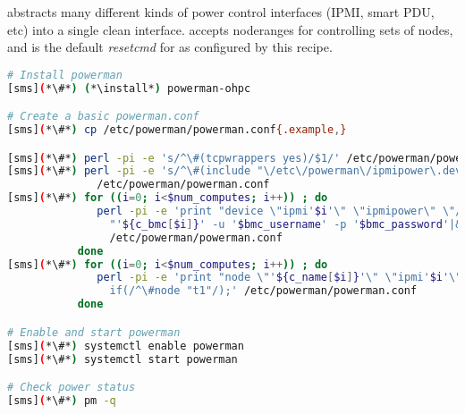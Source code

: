 \powerman{} abstracts many different kinds of power control interfaces (IPMI, 
smart PDU, etc) into a single clean interface. \powerman{} accepts noderanges
for controlling sets of nodes, and is the default {\em resetcmd} for \conman{}
as configured by this recipe.

\begin{lstlisting}[language=bash,keywords={},upquote=true]
# Install powerman
[sms](*\#*) (*\install*) powerman-ohpc

# Create a basic powerman.conf
[sms](*\#*) cp /etc/powerman/powerman.conf{.example,}

[sms](*\#*) perl -pi -e 's/^\#(tcpwrappers yes)/$1/' /etc/powerman/powerman.conf
[sms](*\#*) perl -pi -e 's/^\#(include "\/etc\/powerman\/ipmipower\.dev")/$1/' \
              /etc/powerman/powerman.conf
[sms](*\#*) for ((i=0; i<$num_computes; i++)) ; do
              perl -pi -e 'print "device \"ipmi'$i'\" \"ipmipower\" \"/usr/sbin/ipmipower -h ".
                "'${c_bmc[$i]}' -u '$bmc_username' -p '$bmc_password'|&\"\n" if(/^\#device "ipmi1"/);' \
                /etc/powerman/powerman.conf
           done
[sms](*\#*) for ((i=0; i<$num_computes; i++)) ; do
              perl -pi -e 'print "node \"'${c_name[$i]}'\" \"ipmi'$i'\" \"'${c_bmc[$i]}'\"\n"
                if(/^\#node "t1"/);' /etc/powerman/powerman.conf
           done

# Enable and start powerman
[sms](*\#*) systemctl enable powerman
[sms](*\#*) systemctl start powerman

# Check power status
[sms](*\#*) pm -q
\end{lstlisting}

